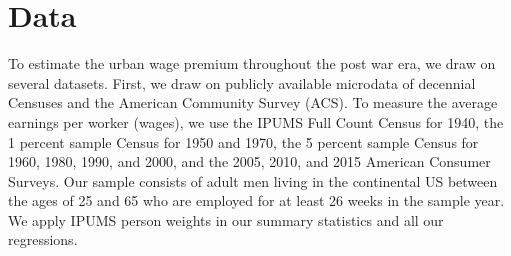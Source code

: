 \documentclass[12pt,twoside]{article}
\begin{document}


\section{Data}

To estimate the urban wage premium throughout the post war era, we draw on several datasets. 
First, we draw on publicly available microdata of decennial Censuses and the American Community Survey (ACS). 
To measure the average earnings per worker (wages),  we use the IPUMS Full Count Census for 1940, the 1 percent sample Census for 1950 and 1970, the 5 percent sample Census for 1960, 1980, 1990, and 2000, and the 2005, 2010, and 2015 American Consumer Surveys. 
Our sample consists of adult men living in the continental US between the ages of 25 and 65 who are employed for at least 26 weeks in the sample year. 
We apply IPUMS person weights in our summary statistics and all our regressions. 
\end{document}
